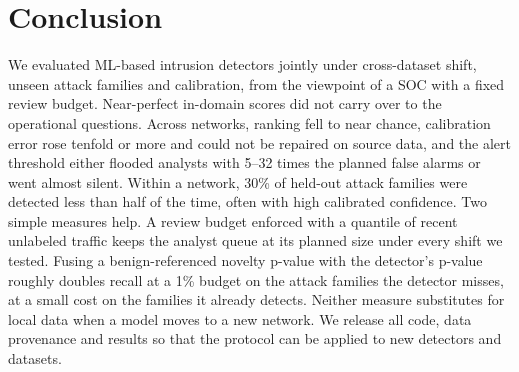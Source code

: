 \section{Conclusion}\label{sec:conclusion}

We evaluated ML-based intrusion detectors jointly under cross-dataset shift, unseen attack families and calibration, from the viewpoint of a SOC with a fixed review budget. Near-perfect in-domain scores did not carry over to the operational questions. Across networks, ranking fell to near chance, calibration error rose tenfold or more and could not be repaired on source data, and the alert threshold either flooded analysts with 5--32 times the planned false alarms or went almost silent. Within a network, 30\% of held-out attack families were detected less than half of the time, often with high calibrated confidence. Two simple measures help. A review budget enforced with a quantile of recent unlabeled traffic keeps the analyst queue at its planned size under every shift we tested. Fusing a benign-referenced novelty p-value with the detector's p-value roughly doubles recall at a 1\% budget on the attack families the detector misses, at a small cost on the families it already detects. Neither measure substitutes for local data when a model moves to a new network. We release all code, data provenance and results so that the protocol can be applied to new detectors and datasets.
